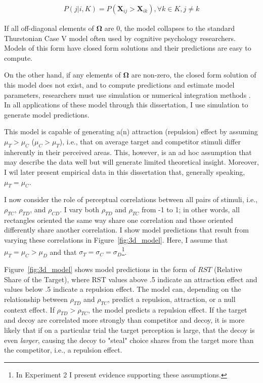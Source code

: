 \begin{align}
   P(j|i,K)=P(\mathbf{X}_{ij}>\mathbf{X}_{ik}), \forall k \in K, j \neq k
   \label{eqn:pchoice}
\end{align}

If all off-diagonal elements of $\boldsymbol{\Omega}$ are $0$, the model collapses to the standard Thurstonian Case V model \parencite{thurstone1927law} often used by cognitive psychology researchers. Models of this form have closed form solutions and their predictions are easy to compute.

On the other hand, if any elements of $\boldsymbol{\Omega}$ are non-zero, the closed form solution of this model does not exist, and to compute predictions and estimate model parameters, researchers must use simulation or numerical integration methods \parencite{train2009discrete}. In all applications of these model through this dissertation, I use simulation to generate model predictions. 

This model is capable of generating a(n) attraction (repulsion) effect by assuming $\mu_{T}>\mu_{C}$ ($\mu_{C}>\mu_{T}$), i.e., that on average target and competitor stimuli differ inherently in their perceived areas. This, however, is an ad hoc assumption that may describe the data well but will generate limited theoretical insight. Moreover, I wil later present empirical data in this dissertation that, generally speaking, $\mu_{T}=\mu_{C}$. 

I now consider the role of perceptual correlations between all pairs of stimuli, i.e., $\rho_{TC}$, $\rho_{TD}$, and $\rho_{CD}$. I vary both $\rho_{TD}$ and $\rho_{TC}$ from -1 to 1; in other words, all rectangles oriented the same way share one correlation and those oriented differently share another correlation. I show model predictions that result from varying these correlations in Figure~\ref{fig:3d_model}. Here, I assume that $\mu_{T}=\mu_{C}>\mu_{D}$ and that $\sigma_{T}=\sigma_{C}=\sigma_{D}$\footnote{In Experiment 2 I present evidence supporting these assumptions.}. 

Figure~\ref{fig:3d_model} shows model predictions in the form of $RST$ (Relative Share of the Target), where RST values above .5 indicate an attraction effect and values below .5 indicate a repulsion effect. The model can, depending on the relationship between $\rho_{TD}$ and $\rho_{TC}$, predict a repulsion, attraction, or a null context effect. If $\rho_{TD}>\rho_{TC}$, the model predicts a repulsion effect. If the target and decoy are correlated more strongly than competitor and decoy, it is more likely that if on a particular trial the target perception is large, that the decoy is even \textit{larger}, causing the decoy to "steal" choice shares from the target more than the competitor, i.e., a repulsion effect.

